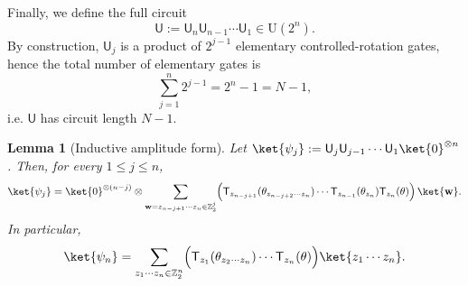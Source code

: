 \documentclass{article}
\newtheorem{lemma}[theorem]{Lemma}
\newcommand{\rU}{\mathsf{U}}
\numberwithin{equation}{section}
\begin{document}
Finally, we define the full circuit
\[
\rU := \rU_n\rU_{n-1}\cdots \rU_1 \in \mathrm{U}(2^n).
\]
By construction, $\rU_j$ is a product of $2^{j-1}$ elementary controlled-rotation gates, hence the
total number of elementary gates is
\[
\sum_{j=1}^n 2^{j-1} = 2^n-1 = N-1,
\]
i.e. $\rU$ has circuit length $N-1$.

\begin{lemma}[Inductive amplitude form]\label{lem:inductive_state}
Let $\ket{\psi_j}:=\rU_j\rU_{j-1}\cdots \rU_1\ket{0}^{\otimes n}$.
Then, for every $1\le j\le n$,
\[
\ket{\psi_j}
=
\ket{0}^{\otimes (n-j)}\otimes
\sum_{\mathbf{w}=z_{n-j+1}\cdots z_n\in\mathbb{Z}_2^{j}}
\Bigl(\mathsf{T}_{z_{n-j+1}}(\theta_{z_{n-j+2}\cdots z_n})\cdots
\mathsf{T}_{z_{n-1}}(\theta_{z_n})\mathsf{T}_{z_n}(\theta)\Bigr)\,
\ket{\mathbf{w}}.
\]
In particular,
\[
\ket{\psi_n}
=
\sum_{z_1\cdots z_n\in\mathbb{Z}_2^n}
\Bigl(\mathsf{T}_{z_1}(\theta_{z_2\cdots z_n})\cdots \mathsf{T}_{z_n}(\theta)\Bigr)\ket{z_1\cdots z_n}.
\]
\end{lemma}
\end{document}
